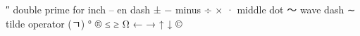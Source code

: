 ″  double prime for inch
– en dash
±
−  minus
÷
×
· middle dot
〜 wave dash
∼ tilde operator (ㄱ) %
°
®
≤
≥
Ω
← → ↑ ↓
 ©
